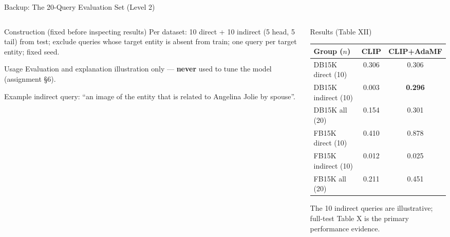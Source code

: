 \documentclass[aspectratio=169,10pt]{beamer}
\begin{document}
\begin{frame}[noframenumbering]{Backup: The 20-Query Evaluation Set (Level 2)}
  \begin{columns}[t]
    \begin{column}{0.50\textwidth}
      \begin{block}{Construction (fixed before inspecting results)}\footnotesize
        Per dataset: 10 direct + 10 indirect (5 head, 5 tail) from test; exclude queries whose target entity is absent from train; one query per target entity; fixed seed.
      \end{block}
      \vspace{0.15cm}
      \begin{block}{Usage}\footnotesize
        Evaluation and explanation illustration only --- \textbf{never} used to tune the model (assignment \S 6).
      \end{block}
      \vspace{0.15cm}
      {\footnotesize Example indirect query: ``an image of the entity that is related to Angelina Jolie by spouse''.}
    \end{column}
    \begin{column}{0.48\textwidth}
      \begin{block}{Results (Table XII)}\footnotesize
        \centering
        \begin{tabular}{@{}lcc@{}}
          \toprule
          Group ($n$) & CLIP & CLIP+AdaMF\\
          \midrule
          DB15K direct (10) & 0.306 & 0.306\\
          DB15K indirect (10) & 0.003 & \textbf{0.296}\\
          DB15K all (20) & 0.154 & 0.301\\
          \midrule
          FB15K direct (10) & 0.410 & 0.878\\
          FB15K indirect (10) & 0.012 & 0.025\\
          FB15K all (20) & 0.211 & 0.451\\
          \bottomrule
        \end{tabular}
      \end{block}
      \vspace{0.1cm}
      {\footnotesize\color{Slate} The 10 indirect queries are illustrative; full-test Table X is the primary performance evidence.}
    \end{column}
  \end{columns}
\end{frame}
\end{document}

